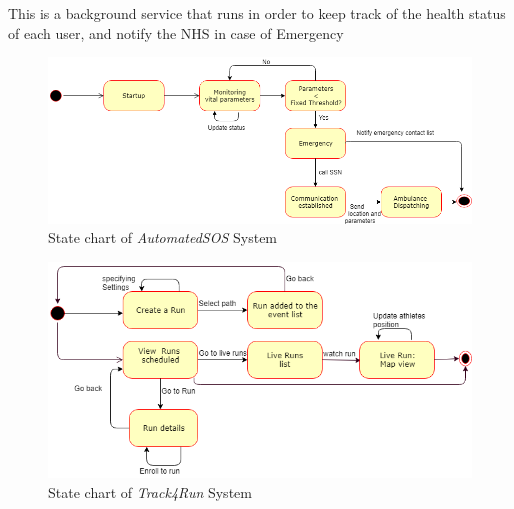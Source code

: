 This is a background service that runs in order to keep track of the health status of each user, and notify the NHS in case of Emergency 
\begin{figure}[H]
    \centering
    \includegraphics[scale=0.4]{Pictures/stateChart2.png}
    \caption{State chart of \emph{AutomatedSOS} System}
\end{figure}
\begin{figure}[H]
    \centering
    \includegraphics[scale=0.4]{Pictures/statechart3.png}
    \caption{State chart  of \emph{Track4Run} System}
\end{figure}